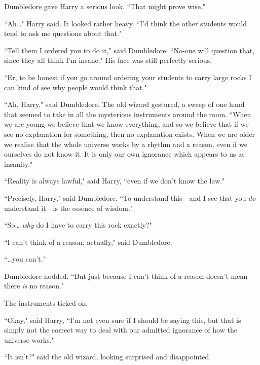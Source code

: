 Dumbledore gave Harry a serious look. ``That might prove wise."

``Ah{\ldots}" Harry said. It looked rather heavy. ``I'd think the other students would tend to ask me questions about that."

``Tell them I ordered you to do it," said Dumbledore. ``No-one will question that, since they all think I'm insane." His face was still perfectly serious.

``Er, to be honest if you go around ordering your students to carry large rocks I can kind of see why people would think that."

``Ah, Harry," said Dumbledore. The old wizard gestured, a sweep of one hand that seemed to take in all the mysterious instruments around the room. ``When we are young we believe that we know everything, and so we believe that if we see no explanation for something, then no explanation exists. When we are older we realise that the whole universe works by a rhythm and a reason, even if we ourselves do not know it. It is only our own ignorance which appears to us as insanity."

``Reality is always lawful," said Harry, ``even if we don't know the law."

``Precisely, Harry," said Dumbledore. ``To understand this—and I see that you \emph{do} understand it—is the essence of wisdom."

``So{\ldots} \emph{why} do I have to carry this rock exactly?"

``I can't think of a reason, actually," said Dumbledore.

``{\ldots}you can't."

Dumbledore nodded. ``But just because I can't think of a reason doesn't mean there \emph{is} no reason."

The instruments ticked on.

``Okay," said Harry, ``I'm not even sure if I should be saying this, but that is simply not the correct way to deal with our admitted ignorance of how the universe works."

``It isn't?" said the old wizard, looking surprised and disappointed.

